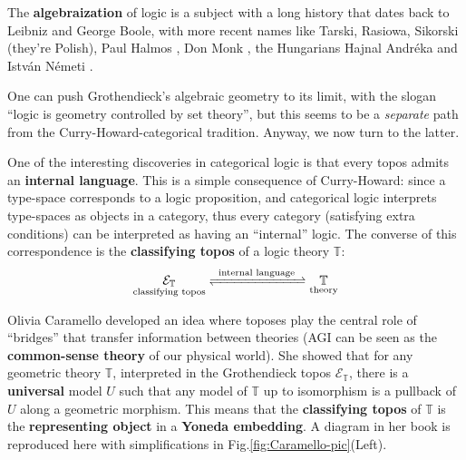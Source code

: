 \documentclass[runningheads]{llncs}
\begin{document}
The \textbf{algebraization} of logic is a subject with a long history that dates back to Leibniz and George Boole, with more recent names like Tarski, Rasiowa, Sikorski (they're Polish), Paul Halmos \cite{Halmos1962} \cite{Halmos1998}, Don Monk \cite{Monk1971}, the Hungarians Hajnal Andr\'{e}ka and Istv\'{a}n N\'{e}meti \cite{Andreka1991} \cite{Andreka2021}.  

One can push Grothendieck's algebraic geometry to its limit, with the slogan ``logic is geometry controlled by set theory'', but this seems to be a \textit{separate} path from the Curry-Howard-categorical tradition.  Anyway, we now turn to the latter.


One of the interesting discoveries in categorical logic is that every topos admits an \textbf{internal language}.  This is a simple consequence of Curry-Howard: since a type-space corresponds to a logic proposition, and categorical logic interprets type-spaces as objects in a category, thus every category (satisfying extra conditions) can be interpreted as having an ``internal'' logic.  The converse of this correspondence is the \textbf{classifying topos} of a logic theory $\mathbb{T}$:
\begin{equation}
\underset{\footnotesize\text{classifying topos}}{\mathcal{E}_\mathbb{T}} \xrightleftharpoons[]{\; \text{ internal language } \;} \underset{\footnotesize\text{theory}}{\mathbb{T}}
\end{equation}

Olivia Caramello \cite{Caramello2018} developed an idea where toposes play the central role of ``bridges'' that transfer information between theories (AGI can be seen as the \textbf{common-sense theory} of our physical world).  She showed that for any geometric theory $\mathbb{T}$, interpreted in the Grothendieck topos $\mathcal{E}_\mathbb{T}$, there is a \textbf{universal} model $U$ such that any model of $\mathbb{T}$ up to isomorphism is a pullback of $U$ along a geometric morphism.  This means that the \textbf{classifying topos} of $\mathbb{T}$ is the \textbf{representing object} in a \textbf{Yoneda embedding}.  A diagram in her book is reproduced here with simplifications in Fig.\ref{fig:Caramello-pic}(Left).
\end{document}
